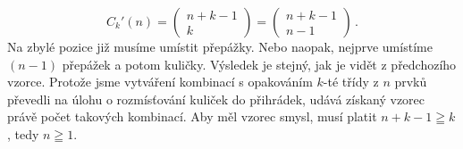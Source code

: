 \begin{example}
  \begin{equation}\label{MAI:eq011}
  \boxed{C_k'(n) =  
    \begin{pmatrix}
        n + k - 1 \\
        k
    \end{pmatrix} = 
    \begin{pmatrix}
        n + k - 1 \\
        n-1
    \end{pmatrix}
    }\, .
  \end{equation}
  Na zbylé pozice již musíme umístit přepážky. Nebo naopak, nejprve umístíme \((n - 1)\) přepážek a 
  potom kuličky. Výsledek je stejný, jak je vidět z předchozího vzorce. Protože jsme vytváření 
  kombinací s opakováním \(k\)-té třídy z \(n\) prvků převedli na úlohu o rozmísťování kuliček do 
  přihrádek, udává získaný vzorec právě počet takových kombinací. Aby měl vzorec smysl, musí platit 
  \(n + k - 1 \geqq k\), tedy \(n \geqq 1\).
  
\end{example}